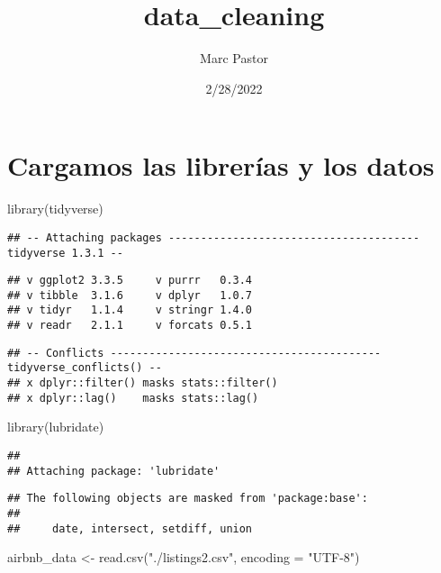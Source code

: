 \documentclass[
]{article}
\title{data\_cleaning}
\author{Marc Pastor}
\date{2/28/2022}
\newenvironment{Shaded}{\begin{snugshade}}{\end{snugshade}}
\newcommand{\AttributeTok}[1]{\textcolor[rgb]{0.77,0.63,0.00}{#1}}
\newcommand{\FunctionTok}[1]{\textcolor[rgb]{0.00,0.00,0.00}{#1}}
\newcommand{\NormalTok}[1]{#1}
\newcommand{\OtherTok}[1]{\textcolor[rgb]{0.56,0.35,0.01}{#1}}
\newcommand{\StringTok}[1]{\textcolor[rgb]{0.31,0.60,0.02}{#1}}
\begin{document}
\maketitle

\hypertarget{cargamos-las-libreruxedas-y-los-datos}{%
\section{Cargamos las librerías y los
datos}\label{cargamos-las-libreruxedas-y-los-datos}}

\begin{Shaded}
\begin{Highlighting}[]
\FunctionTok{library}\NormalTok{(tidyverse)}
\end{Highlighting}
\end{Shaded}

\begin{verbatim}
## -- Attaching packages --------------------------------------- tidyverse 1.3.1 --
\end{verbatim}

\begin{verbatim}
## v ggplot2 3.3.5     v purrr   0.3.4
## v tibble  3.1.6     v dplyr   1.0.7
## v tidyr   1.1.4     v stringr 1.4.0
## v readr   2.1.1     v forcats 0.5.1
\end{verbatim}

\begin{verbatim}
## -- Conflicts ------------------------------------------ tidyverse_conflicts() --
## x dplyr::filter() masks stats::filter()
## x dplyr::lag()    masks stats::lag()
\end{verbatim}

\begin{Shaded}
\begin{Highlighting}[]
\FunctionTok{library}\NormalTok{(lubridate)}
\end{Highlighting}
\end{Shaded}

\begin{verbatim}
## 
## Attaching package: 'lubridate'
\end{verbatim}

\begin{verbatim}
## The following objects are masked from 'package:base':
## 
##     date, intersect, setdiff, union
\end{verbatim}

\begin{Shaded}
\begin{Highlighting}[]
\NormalTok{airbnb\_data }\OtherTok{\textless{}{-}} \FunctionTok{read.csv}\NormalTok{(}\StringTok{"./listings2.csv"}\NormalTok{, }\AttributeTok{encoding =} \StringTok{"UTF{-}8"}\NormalTok{) }
\end{Highlighting}
\end{Shaded}
\end{document}
